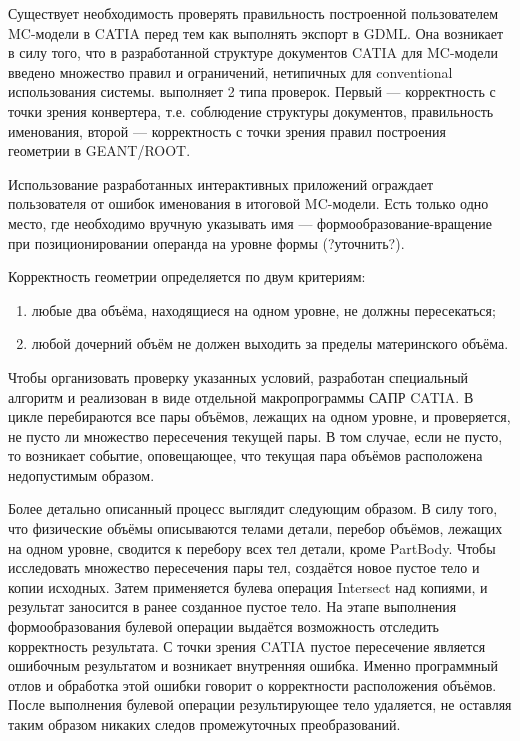 Существует необходимость проверять правильность построенной пользователем MC-модели в CATIA перед тем как выполнять экспорт в GDML. Она возникает в силу того, что в разработанной структуре документов CATIA для MC-модели введено множество правил и ограничений, нетипичных для conventional использования системы.  выполняет 2 типа проверок. Первый --- корректность с точки зрения конвертера, т.е. соблюдение структуры документов, правильность именования, второй --- корректность с точки зрения правил построения геометрии в GEANT/ROOT.

Использование разработанных интерактивных приложений ограждает пользователя от ошибок именования в итоговой MC-модели. Есть только одно место, где необходимо вручную указывать имя --- формообразование-вращение при позиционировании операнда на уровне формы (?уточнить?).

Корректность геометрии определяется по двум критериям:
\begin{enumerate}
\item любые два объёма, находящиеся на одном уровне, не должны пересекаться;
\item любой дочерний объём не должен выходить за пределы материнского объёма.
\end{enumerate}

Чтобы организовать проверку указанных условий, разработан специальный алгоритм и реализован в виде отдельной макропрограммы  САПР CATIA. В цикле перебираются все пары объёмов, лежащих на одном уровне, и проверяется, не пусто ли множество пересечения текущей пары. В том случае, если не пусто, то возникает событие, оповещающее, что текущая пара объёмов расположена недопустимым образом.

Более детально описанный процесс выглядит следующим образом. В силу того, что физические объёмы описываются телами детали, перебор объёмов, лежащих на одном уровне, сводится к перебору всех тел детали, кроме PartBody. Чтобы исследовать множество пересечения пары тел, создаётся новое пустое тело и копии исходных. Затем применяется булева операция Intersect над копиями, и результат заносится в ранее созданное пустое тело. На этапе выполнения формообразования булевой операции выдаётся возможность отследить корректность результата. С точки зрения CATIA пустое пересечение является ошибочным результатом и возникает внутренняя ошибка. Именно программный отлов и обработка этой ошибки говорит о корректности расположения объёмов. После выполнения булевой операции результирующее тело удаляется, не оставляя таким образом никаких следов промежуточных преобразований.

